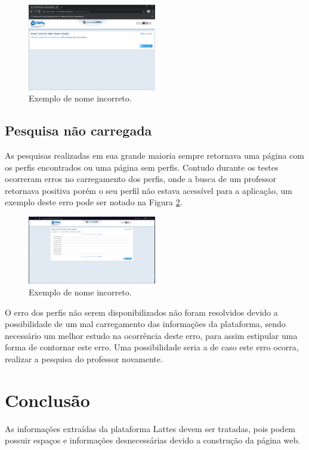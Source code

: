 \documentclass[conference]{IEEEtran}
\begin{document}
\begin{figure}[htbp]
\centerline{\includegraphics[width=0.5\textwidth]{exemplo4.png}}
\caption{Exemplo de nome incorreto.}
\label{notfound}
\end{figure}

\subsection{Pesquisa não carregada}

As pesquisas realizadas em sua grande maioria sempre retornava uma página com os perfis encontrados ou uma página sem perfis. Contudo durante os testes ocorreram erros no carregamento dos perfis, onde a busca de um professor retornava positiva porém o seu perfil não estava acessível para a aplicação, um exemplo deste erro pode ser notado na Figura \ref{noperfil}.

\begin{figure}[htbp]
\centerline{\includegraphics[width=0.5\textwidth]{exemplo3.png}}
\caption{Exemplo de nome incorreto.}
\label{noperfil}
\end{figure}

O erro dos perfis não serem disponibilizados não foram resolvidos devido a possibilidade de um mal carregamento das informações da plataforma, sendo necessário um melhor estudo na ocorrência deste erro, para assim estipular uma forma de contornar este erro. Uma possibilidade seria a de caso este erro ocorra, realizar a pesquisa do professor novamente.

\section{Conclusão}
As informações extraídas da plataforma Lattes devem ser tratadas, pois podem possuir espaços e informações desnecessárias devido a construção da página web.
\end{document}
